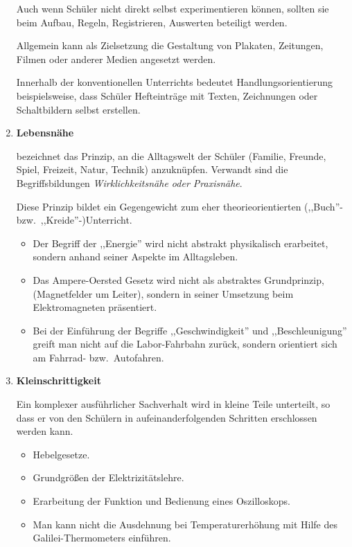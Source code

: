 \begin{enumerate}
	\mip
	Auch wenn Sch\"{u}ler nicht direkt selbst experimentieren
	k\"{o}nnen, sollten sie beim Aufbau, Regeln, Registrieren, Auswerten
	beteiligt werden.
	
	\mip
	Allgemein kann als Zielsetzung die Gestaltung von
	Plakaten, Zeitungen,
	Filmen oder anderer Medien angesetzt werden.
	
	\mip
	Innerhalb der konventionellen Unterrichts bedeutet
	Handlungsorientierung
	beispielsweise, dass Sch\"{u}ler
	Hefteintr\"{a}ge mit Texten, Zeichnungen
	oder Schaltbildern selbst erstellen.
	
	\item{\textbf{Lebensn\"{a}he}}
	
	bezeichnet das Prinzip, an die Alltagswelt der Sch\"{u}ler (Familie, Freunde, Spiel, Freizeit, Natur,
	Technik) anzukn\"{u}pfen. Verwandt sind die Begriffsbildungen
	{\it Wirklichkeitsn\"{a}he oder Praxisn\"{a}he}.
	
	Diese Prinzip bildet ein Gegengewicht zum eher theorieorientierten
	(,,Buch''- bzw.\ ,,Kreide''-)Unterricht.
	\begin{beisp2}
		\begin{itemize}
		\item
		Der Begriff der ,,Energie'' wird nicht abstrakt physikalisch
		erarbeitet, sondern anhand seiner Aspekte im Alltagsleben.
		\item
		Das Ampere-Oersted Gesetz wird nicht als abstraktes Grundprinzip,
		(Magnetfelder um Leiter), sondern in seiner Umsetzung
		beim Elektromagneten pr\"{a}sentiert.
		\item
		Bei der Einf\"{u}hrung der Begriffe ,,Geschwindigkeit'' und
		,,Beschleunigung'' greift man nicht auf die Labor-Fahrbahn
		zur\"{u}ck, sondern orientiert sich am Fahrrad- bzw.\ Autofahren.
		\end{itemize}
	\end{beisp2}
	
	
	\item{\textbf{Kleinschrittigkeit}}
	
	Ein komplexer ausf\"{u}hrlicher Sachverhalt wird
	in kleine Teile unterteilt, so dass er von den Sch\"{u}lern
	in aufeinanderfolgenden Schritten erschlossen werden kann.
	
	\begin{beisp2}
		\begin{itemize}
		\item Hebelgesetze.
		\item Grundgr\"{o}{\ss}en der Elektrizit\"{a}tslehre.
		\item Erarbeitung der Funktion und Bedienung eines Oszilloskops.
		\item Man kann nicht die Ausdehnung bei
		Temperaturerh\"{o}hung mit Hilfe des Galilei-Thermometers einf\"{u}hren.
		\end{itemize}
	\end{beisp2}
	

\end{enumerate}
